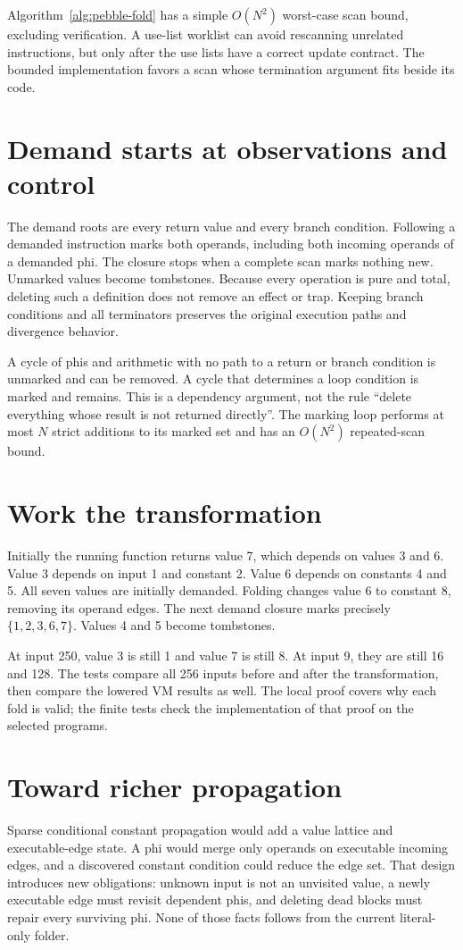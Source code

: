 Algorithm~\ref{alg:pebble-fold} has a simple $O(N^2)$ worst-case scan bound, excluding verification.
A use-list worklist can avoid rescanning unrelated instructions, but only after the use lists have a correct update contract.
The bounded implementation favors a scan whose termination argument fits beside its code.

\section{Demand starts at observations and control}
\label{sec:pebble-dce}
The demand roots are every return value and every branch condition.
Following a demanded instruction marks both operands, including both incoming operands of a demanded phi.
The closure stops when a complete scan marks nothing new.
Unmarked values become tombstones.
Because every operation is pure and total, deleting such a definition does not remove an effect or trap.
Keeping branch conditions and all terminators preserves the original execution paths and divergence behavior.

A cycle of phis and arithmetic with no path to a return or branch condition is unmarked and can be removed.
A cycle that determines a loop condition is marked and remains.
This is a dependency argument, not the rule \enquote{delete everything whose result is not returned directly}.
The marking loop performs at most $N$ strict additions to its marked set and has an $O(N^2)$ repeated-scan bound.

\section{Work the transformation}
\label{sec:pebble-opt-worked}
Initially the running function returns value 7, which depends on values 3 and 6.
Value 3 depends on input 1 and constant 2.
Value 6 depends on constants 4 and 5.
All seven values are initially demanded.
Folding changes value 6 to constant 8, removing its operand edges.
The next demand closure marks precisely $\{1,2,3,6,7\}$.
Values 4 and 5 become tombstones.

At input 250, value 3 is still 1 and value 7 is still 8.
At input 9, they are still 16 and 128.
The tests compare all 256 inputs before and after the transformation, then compare the lowered VM results as well.
The local proof covers why each fold is valid; the finite tests check the implementation of that proof on the selected programs.

\section{Toward richer propagation}
\label{sec:pebble-sccp-extension}
Sparse conditional constant propagation would add a value lattice and executable-edge state.
A phi would merge only operands on executable incoming edges, and a discovered constant condition could reduce the edge set.
That design introduces new obligations: unknown input is not an unvisited value, a newly executable edge must revisit dependent phis, and deleting dead blocks must repair every surviving phi.
None of those facts follows from the current literal-only folder.


